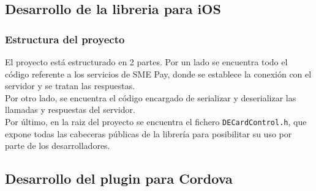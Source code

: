 \documentclass[a4paper, 12pt]{article}
\begin{document}
\subsection{Desarrollo de la libreria para iOS}
\label{sec-4-2}
\subsubsection{Estructura del proyecto}
\label{sec-4-2-1}
El proyecto está estructurado en 2 partes. Por un lado se encuentra todo el código referente a los servicios de SME Pay, donde se establece la conexión con el servidor y se tratan las respuestas.
\\
Por otro lado, se encuentra el código encargado de serializar y deserializar las llamadas y respuestas del servidor.
\\
Por último, en la raiz del proyecto se encuentra el fichero \verb~DECardControl.h~, que expone todas las cabeceras públicas de la librería para posibilitar su uso por parte de los desarrolladores.
\subsection{Desarrollo del plugin para Cordova}
\label{sec-4-3}
\end{document}
